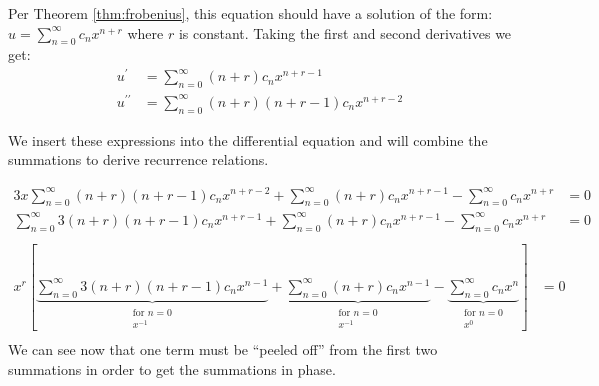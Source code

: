\noindent Per Theorem \ref{thm:frobenius}, this equation should have a solution of the form: $u = \sum_{n=0}^{\infty}c_nx^{n+r}$ where $r$ is constant. Taking the first and second derivatives we get:
\begin{align*}
u^{\prime} &= \sum\limits_{n=0}^{\infty}(n+r)c_nx^{n+r-1} \\
u^{\prime\prime} &= \sum\limits_{n=0}^{\infty}(n+r)(n+r-1)c_nx^{n+r-2}
\end{align*}

\noindent We insert these expressions into the differential equation and will combine the summations to derive recurrence relations.

\begin{align*}
3x\sum\limits_{n=0}^{\infty}(n+r)(n+r-1)c_nx^{n+r-2} + \sum\limits_{n=0}^{\infty}(n+r)c_nx^{n+r-1} - \sum\limits_{n=0}^{\infty}c_nx^{n+r} &= 0 \\
\sum\limits_{n=0}^{\infty}3(n+r)(n+r-1)c_nx^{n+r-1} + \sum\limits_{n=0}^{\infty}(n+r)c_nx^{n+r-1} - \sum\limits_{n=0}^{\infty}c_nx^{n+r} &= 0 \\
\end{align*}
\begin{align*}
x^r\left[\underbrace{\sum\limits_{n=0}^{\infty}3(n+r)(n+r-1)c_nx^{n-1}}_{\substack{\text{for }n=0 \\ x^{-1}}} + \underbrace{\sum\limits_{n=0}^{\infty}(n+r)c_nx^{n-1}}_{\substack{\text{for }n=0 \\ x^{-1}}} - \underbrace{\sum\limits_{n=0}^{\infty}c_nx^n}_{\substack{\text{for }n=0 \\ x^{0}}} \right] &= 0 \\
\end{align*}
We can see now that one term must be ``peeled off'' from the first two summations in order to get the summations in phase. 


